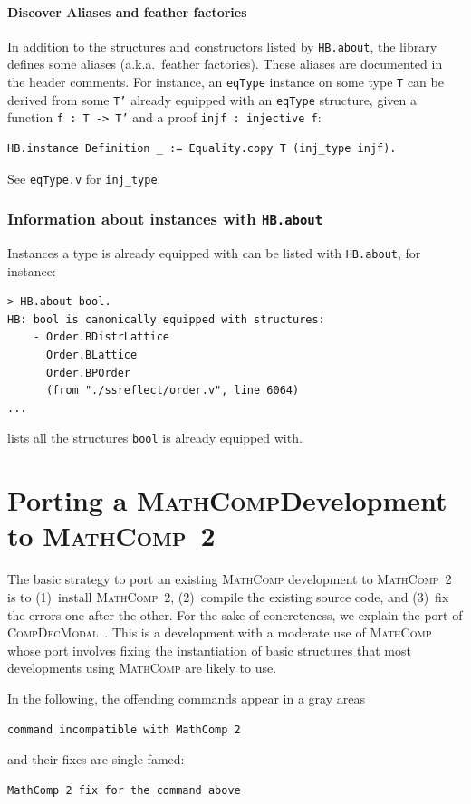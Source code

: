 \documentclass{article}
\def\mathcomp{\textsc{MathComp}}
\def\mathcomptwo{\mathcomp~2}
\def\compdecmodal{\textsc{CompDecModal}}
\def\coqin#1{\texttt{#1}}
\begin{document}
\paragraph{Discover Aliases and feather factories}

In addition to the structures and constructors listed by \coqin{HB.about}, the
library defines some aliases (a.k.a.\ feather factories). These aliases
are documented in the header comments. For instance, an \coqin{eqType}
instance on some type \coqin{T} can be derived from some \coqin{T'} already
equipped with an \coqin{eqType} structure, given a function \coqin{f : T -> T'}
and a proof \coqin{injf : injective f}:
\begin{verbatim}
HB.instance Definition _ := Equality.copy T (inj_type injf).
\end{verbatim}
See \coqin{eqType.v} for \coqin{inj_type}.

\subsubsection{Information about instances with \coqin{HB.about}}

Instances a type is already equipped with can be listed with
\coqin{HB.about}, for instance:
\begin{verbatim}
> HB.about bool.
HB: bool is canonically equipped with structures:
    - Order.BDistrLattice
      Order.BLattice
      Order.BPOrder
      (from "./ssreflect/order.v", line 6064)
...
\end{verbatim}

lists all the structures \coqin{bool} is already equipped with.

\section{Porting a \mathcomp{}Development to \mathcomptwo}
\label{sec:compdecmodal}

The basic strategy to port an existing \mathcomp{} development to
\mathcomptwo{} is to (1)~install \mathcomptwo, (2)~compile the existing source
code, and (3)~fix the errors one after the other.
%
For the sake of concreteness, we explain the port of
\compdecmodal~\cite{compdecmodal}. This is a development with a
moderate use of \mathcomp{} whose port involves fixing the
instantiation of basic structures that most developments using
\mathcomp{} are likely to use.

In the following, the offending commands appear in a gray areas
\begin{verbatim}
command incompatible with MathComp 2
\end{verbatim}
and their fixes are single famed:
\begin{verbatim}
MathComp 2 fix for the command above
\end{verbatim}
\end{document}
